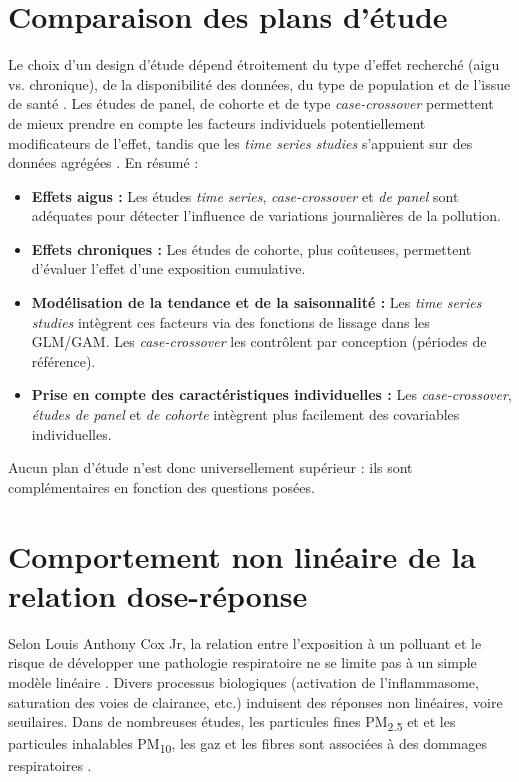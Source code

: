 \section{Comparaison des plans d’étude}
Le choix d'un design d'étude dépend étroitement du type d'effet recherché (aigu vs. chronique), de la disponibilité des données, du type de population et de l'issue de santé \citep{Vedal1996}. Les études de panel, de cohorte et de type \emph{case-crossover} permettent de mieux prendre en compte les facteurs individuels potentiellement modificateurs de l'effet, tandis que les \emph{time series studies} s'appuient sur des données agrégées \citep{WakefieldSalway2001}. En résumé :
\begin{itemize}
  \item \textbf{Effets aigus :} Les études \emph{time series}, \emph{case-crossover} et \emph{de panel} sont adéquates pour détecter l’influence de variations journalières de la pollution.
  \item \textbf{Effets chroniques :} Les études de cohorte, plus coûteuses, permettent d’évaluer l’effet d’une exposition cumulative. 
  \item \textbf{Modélisation de la tendance et de la saisonnalité :} Les \emph{time series studies} intègrent ces facteurs via des fonctions de lissage dans les GLM/GAM. Les \emph{case-crossover} les contrôlent par conception (périodes de référence).
  \item \textbf{Prise en compte des caractéristiques individuelles :} Les \emph{case-crossover}, \emph{études de panel} et \emph{de cohorte} intègrent plus facilement des covariables individuelles.
\end{itemize}
Aucun plan d’étude n’est donc universellement supérieur : ils sont complémentaires en fonction des questions posées.

\section{Comportement non linéaire de la relation dose-réponse}
\label{sec:NonLinearDoseResponse}
Selon Louis Anthony Cox Jr, la relation entre l'exposition à un polluant et le risque de développer une pathologie respiratoire ne se limite pas à un simple modèle linéaire \citep{cox2021quantitative}. Divers processus biologiques (activation de l'inflammasome, saturation des voies de clairance, etc.) induisent des réponses non linéaires, voire seuilaires. Dans de nombreuses études, les particules fines PM\textsubscript{2.5} et et les particules inhalables PM\textsubscript{10}, les gaz et les fibres sont associées à des dommages respiratoires \citep{Bang2015,Donaldson2010,Mazurek2017}.

